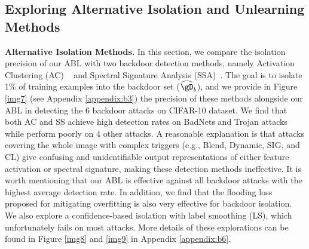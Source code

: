 \subsection{Exploring Alternative Isolation and Unlearning Methods}\label{sec:4.3}
\noindent\textbf{Alternative Isolation Methods.}  \label{sec:alternatives}
In this section, we compare the isolation precision of our ABL with two backdoor detection methods, namely Activation Clustering (AC) ~\cite{chen2018detecting} and Spectral Signature Analysis (SSA)~\cite{tran2018spectral}. The goal is to isolate 1\% of training examples into the backdoor set ($\widehat{\gD}_b$), and we provide in Figure \ref{img7} (see Appendix \ref{appendix:b3}) the precision of these methods alongside our ABL in detecting the 6 backdoor attacks on CIFAR-10 dataset. We find that both AC and SS achieve high detection rates on BadNets and Trojan attacks while perform poorly on 4 other attacks. A reasonable explanation is that attacks covering the whole image with complex triggers (e.g., Blend, Dynamic, SIG, and CL) give confusing and unidentifiable output representations of either feature activation or spectral signature, making these detection methods ineffective. It is worth mentioning that our ABL is effective against all backdoor attacks with the highest average detection rate. In addition, we find that the flooding loss \cite{ishida2020we} proposed for mitigating overfitting is also very effective for backdoor isolation. 
We also explore a confidence-based isolation with label smoothing (LS), which unfortunately fails on most attacks. More details of these explorations can be found in Figure \ref{img8} and \ref{img9} in Appendix \ref{appendix:b6}. 

